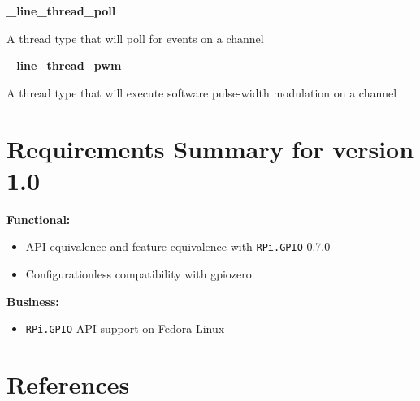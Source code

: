 \documentclass[12pt]{article}
\begin{document}
\noindent \textbf{\_line\_thread\_poll}

A thread type that will poll for events on a channel

\noindent \textbf{\_line\_thread\_pwm}

A thread type that will execute software pulse-width modulation on a channel

\section{Requirements Summary for version 1.0}

\noindent \textbf{Functional:}
\begin{itemize}
    \item API-equivalence and feature-equivalence with \texttt{RPi.GPIO} 0.7.0 \cite{rpigpio}
    \item Configurationless compatibility with gpiozero \cite{gpiozero}
\end{itemize}

\noindent \textbf{Business:}
\begin{itemize}
    \item \texttt{RPi.GPIO} API support on Fedora Linux
\end{itemize}


\section{References}



\end{document}
